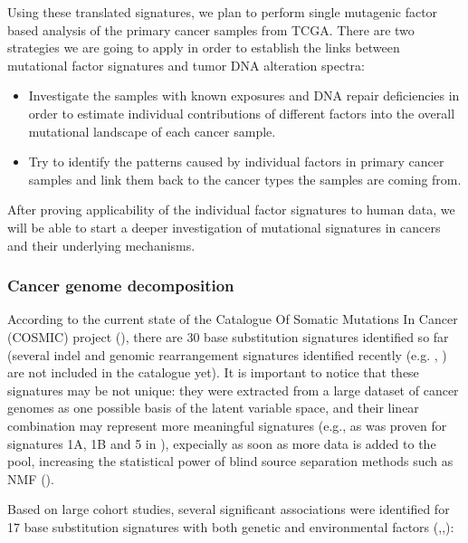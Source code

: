 Using these translated signatures, we plan to perform single mutagenic factor based analysis of the primary cancer samples from TCGA. There are two strategies we are going to apply in order to establish the links between mutational factor signatures and tumor DNA alteration spectra:

\begin{itemize}
\item Investigate the samples with known exposures and DNA repair deficiencies in order to estimate individual contributions of different factors into the overall mutational landscape of each cancer sample. 
\item Try to identify the patterns caused by individual factors in primary cancer samples and link them back to the cancer types the samples are coming from.
\end{itemize}

After proving applicability of the individual factor signatures to human data, we will be able to start a deeper investigation of mutational signatures in cancers and their underlying mechanisms.


\subsubsection*{Cancer genome decomposition}

According to the current state of the Catalogue Of Somatic Mutations In Cancer (COSMIC) project (\cite{COSMIC}), there are 30 base substitution signatures identified so far (several indel and genomic rearrangement signatures identified recently (e.g. \cite{Alex5}, \cite{NZ2}) are not included in the catalogue yet). It is important to notice that these signatures may be not unique: they were extracted from a large dataset of cancer genomes as one possible basis of the latent variable space, and their linear combination may represent more meaningful signatures (e.g., as was proven for signatures 1A, 1B and 5 in \cite{Alex3}), expecially as soon as more data is added to the pool, increasing the statistical power of blind source separation methods such as NMF (\cite{Alex2}).

Based on large cohort studies, several significant associations were identified for 17 base substitution signatures with both genetic and environmental factors (\cite{Alex1},\cite{Alex2},\cite{Roberts}):

